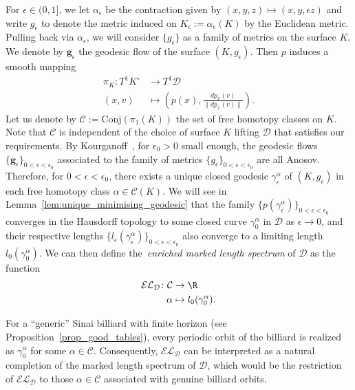 \documentclass[reqno,11pt]{amsart}
\begin{document}
\par For \( \epsilon \in (0,1] \), we let \( \alpha_\epsilon \) be the contraction given by \( (x,y,z) \mapsto (x, y, \epsilon z) \) and write \( g_\epsilon \) to denote the metric induced on \( K_\epsilon := \alpha_\epsilon(K) \) by the Euclidean metric.
Pulling back via \( \alpha_\epsilon \), we will consider \( \{g_\epsilon\} \) as a family of metrics on the surface \( K \). 
We denote by \( \mathbf{g}_\epsilon \) the geodesic flow of the surface \( (K, g_\epsilon) \).
Then \( p \) induces a smooth mapping
\begin{equation*} 
\begin{split}
    \pi_K\colon T^1K^\circ &\to T^1 \mathcal{D} \\
    (x,v) &\mapsto \left(p(x), \frac{dp_x(v)}{\|dp_x(v)\|}\right).
\end{split}
\end{equation*} 
Let us denote by \( \mathcal{C}:= \mathrm{Conj}(\pi_1(K)) \) the set of free homotopy classes on \( K \). Note that $\mathcal{C}$ is independent of the choice of surface $K$ lifting $\mathcal{D}$ that satisfies our requirements. By Kourganoff~\cite{kourganoff_anosov_2016}, for $\epsilon_0>0$ small enough, the geodesic flows $\{\mathbf{g}_\epsilon\}_{0<\epsilon<\epsilon_0}$ associated to the family of metrics $\{g_\epsilon\}_{0<\epsilon<\epsilon_0}$ are all Anosov. Therefore, for $0<\epsilon<\epsilon_0$, there exists a unique closed geodesic \( \gamma_\epsilon^\alpha\) of \( (K, g_\epsilon) \) in each free homotopy class \( \alpha \in \mathcal{C}(K) \). We will see in Lemma~\ref{lem:unique_minimising_geodesic} that the 
family $\{p(\gamma_\epsilon^\alpha)\}_{0<\epsilon<\epsilon_0}$ converges in the Hausdorff topology to some closed curve \( \gamma^\alpha_0 \) in $\mathcal{D}$ as $\epsilon\to 0$, and their respective lengths $\{l_\epsilon(\gamma_\epsilon^\alpha)\}_{0<\epsilon<\epsilon_0}$ also converge to a limiting length $l_0(\gamma_0^\alpha)$. We can then define the~\emph{enriched marked length spectrum} of \( \mathcal{D} \) as the function
    \begin{align*}
        \mathcal{EL}_{\mathcal{D}}\colon \mathcal{C} &\to \R \\
        \alpha &\mapsto l_0(\gamma_0^\alpha). 
    \end{align*} 
\begin{remark}
For a ``generic'' Sinai billiard with finite horizon (see Proposition~\ref{prop_good_tables}), every periodic orbit of the billiard is realized as $\gamma_0^\alpha$ for some $\alpha \in \mathcal{C}$. Consequently, $\mathcal{EL}_\mathcal{D}$ can be interpreted as a natural completion of the marked length spectrum of $\mathcal{D}$, which would be the restriction of $\mathcal{EL}_\mathcal{D}$ to those $\alpha \in \mathcal{C}$ associated with genuine billiard orbits.
\end{remark}
\end{document}
